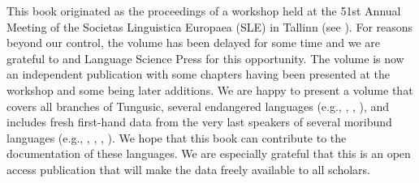 \begin{refsection}
This book originated as the proceedings of a workshop held at the 51st Annual Meeting of the Societas Linguistica Europaea (SLE) in Tallinn (see \citealt{HölzlPayne2018}). For reasons beyond our control, the volume has been delayed for some time and we are grateful to  and Language Science Press for this opportunity. The volume is now an independent publication with some chapters having been presented at the workshop and some being later additions. We are happy to present a volume that covers all branches of Tungusic, several endangered languages (e.g., , , ), and includes fresh first-hand data from the very last speakers of several moribund languages (e.g., , , , ). We hope that this book can contribute to the documentation of these languages. We are especially grateful that this is an open access publication that will make the data freely available to all scholars.

{\sloppy\printbibliography[heading=subbibliography]}
\end{refsection}

